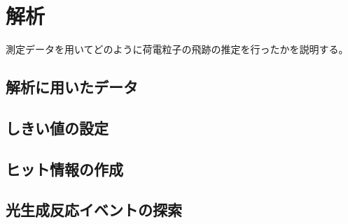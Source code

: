 \chapter{解析}\label{analysis}
測定データを用いてどのように荷電粒子の飛跡の推定を行ったかを説明する。
\section{解析に用いたデータ}
\section{しきい値の設定}
\section{ヒット情報の作成}
\section{光生成反応イベントの探索}